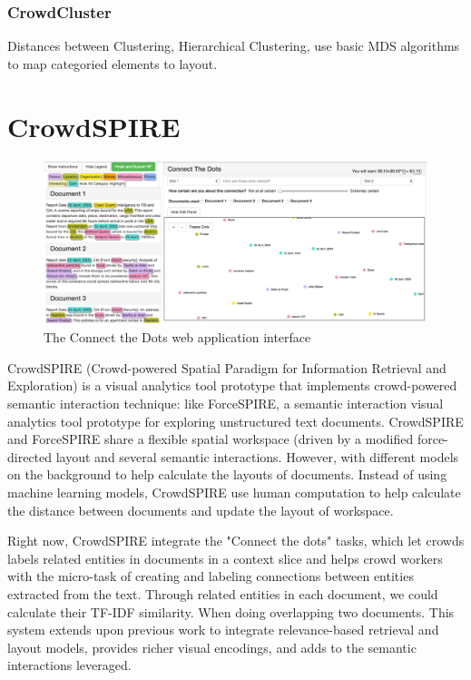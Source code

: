 \documentclass[journal]{vgtc}                %
\begin{document}
\subsubsection{CrowdCluster}

Distances between Clustering, Hierarchical Clustering, use basic MDS algorithms to map categoried elements to layout.




\section{CrowdSPIRE}
\begin{figure}
 \centering
  \includegraphics[width=\textwidth]{Hit}
 \caption{The Connect the Dots web application interface}
 \label{fig:hit}
\end{figure}

CrowdSPIRE (Crowd-powered Spatial Paradigm for Information Retrieval and Exploration) is a visual analytics tool prototype that implements crowd-powered semantic interaction technique: like ForceSPIRE, a semantic interaction visual analytics tool prototype for exploring unstructured text documents.
CrowdSPIRE and ForceSPIRE share a flexible spatial workspace (driven by a modified force-directed layout and several semantic interactions.
However, with different models on the background to help calculate the layouts of documents.
Instead of using machine learning models, CrowdSPIRE use human computation to help calculate the distance between documents and update the layout of workspace.

Right now, CrowdSPIRE integrate the "Connect the dots" tasks, which let crowds labels related entities in documents in a context slice and helps crowd workers with the micro-task of creating and labeling connections between entities extracted from the text.
Through related entities in each document, we could calculate their TF-IDF similarity. When doing overlapping two documents.
This system extends upon previous work to integrate relevance-based retrieval and layout models, provides richer visual encodings, and adds to the semantic interactions leveraged.
\end{document}
